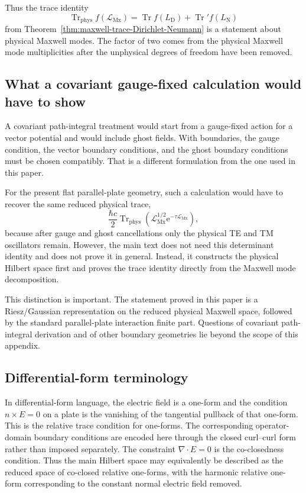 \documentclass[11pt]{article}
\providecommand{\ee}{\mathrm{e}}
\providecommand{\Tr}{\operatorname{Tr}}
\providecommand{\Trphys}{\operatorname{Tr}_{\mathrm{phys}}}
\providecommand{\paren}[1]{\left(#1\right)}
\providecommand{\LMx}{\mathcal L_{\mathrm{Mx}}}
\providecommand{\LD}{L_{\mathrm D}}
\providecommand{\LN}{L_{\mathrm N}}
\numberwithin{equation}{section}
\begin{document}
Thus the trace identity
\begin{equation}
    \Trphys f(\LMx)
    =\Tr f(\LD)+\Tr' f(\LN)
    \label{eq:gauge-comment-DN-trace}
\end{equation}
from Theorem~\ref{thm:maxwell-trace-Dirichlet-Neumann} is a statement about
physical Maxwell modes.  The factor of two comes from the physical Maxwell
mode multiplicities after the unphysical degrees of freedom have been removed.

\subsection{What a covariant gauge-fixed calculation would have to show}
\label{subsec:covariant-gauge-fixed-comment}

A covariant path-integral treatment would start from a gauge-fixed action for
a vector potential and would include ghost fields.  With boundaries, the gauge
condition, the vector boundary conditions, and the ghost boundary conditions
must be chosen compatibly.  That is a different formulation from the one used
in this paper.

For the present flat parallel-plate geometry, such a calculation would have to
recover the same reduced physical trace,
\begin{equation}
    \frac{\hbar c}{2}\Trphys\paren{\LMx^{1/2}\ee^{-\tau\LMx}},
    \label{eq:expected-covariant-endpoint-appendixC}
\end{equation}
because after gauge and ghost cancellations only the physical TE and TM
oscillators remain.  However, the main text does not need this determinant
identity and does not prove it in general.  Instead, it constructs the physical
Hilbert space first and proves the trace identity directly from the Maxwell
mode decomposition.

This distinction is important.  The statement proved in this paper is a
Riesz/Gaussian representation on the reduced physical Maxwell space, followed
by the standard parallel-plate interaction finite part.  Questions of
covariant path-integral derivation and of other boundary geometries lie beyond
the scope of this appendix.

\subsection{Differential-form terminology}
\label{subsec:differential-form-comment}

In differential-form language, the electric field is a one-form and the
condition \(n\times E=0\) on a plate is the vanishing of the tangential
pullback of that one-form.  This is the relative trace condition for
one-forms.  The corresponding operator-domain boundary conditions are encoded
here through the closed curl--curl form rather than imposed separately.  The
constraint \(\nabla\cdot E=0\) is the co-closedness condition.
Thus the main Hilbert space may equivalently be described as the reduced space
of co-closed relative one-forms, with the harmonic relative one-form
corresponding to the constant normal electric field removed.
\end{document}
